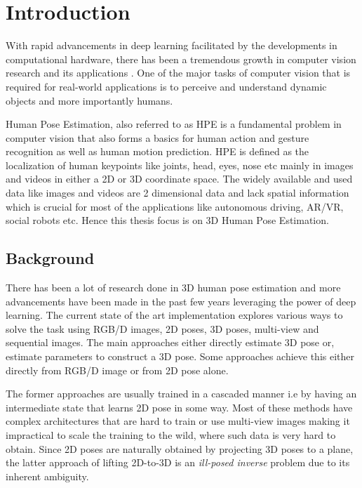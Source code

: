 \chapter{Introduction}
\label{chap:introduction}
With rapid advancements in deep learning facilitated by the developments in computational hardware, there has been a tremendous growth in computer vision research and its applications \cite{AIandCompute}. One of the major tasks of computer vision that is required for real-world applications is to perceive and understand dynamic objects and more importantly humans. 

Human Pose Estimation, also referred to as HPE is a fundamental problem in computer vision that also forms a basics for human action and gesture recognition as well as human motion prediction. HPE is defined as the localization of human keypoints like joints, head, eyes, nose etc mainly in images and videos in either a 2D or 3D coordinate space. The widely available and used data like images and videos are 2 dimensional data and lack spatial information which is crucial for most of the applications like autonomous driving, AR/VR, social robots etc. Hence this thesis focus is on 3D Human Pose Estimation.



\section{Background}
\label{sec:background}

There has been a lot of research done in 3D human pose estimation and more advancements have been made in the past few years leveraging the power of deep learning. The current state of the art implementation explores various ways to solve the task using RGB/D images, 2D poses, 3D poses, multi-view and sequential images. The main approaches either directly estimate 3D pose or, estimate parameters to construct a 3D pose. Some approaches achieve this either directly from RGB/D image or from 2D pose alone.

The former approaches are usually trained in a cascaded manner i.e by having an intermediate state that learns 2D pose in some way. Most of these methods have complex architectures that are hard to train or use multi-view images making it impractical to scale the training to the wild, where such data is very hard to obtain. Since 2D poses are naturally obtained by projecting 3D poses to a plane, the latter approach of lifting 2D-to-3D is an \textit{ill-posed inverse} problem due to its inherent ambiguity. 

